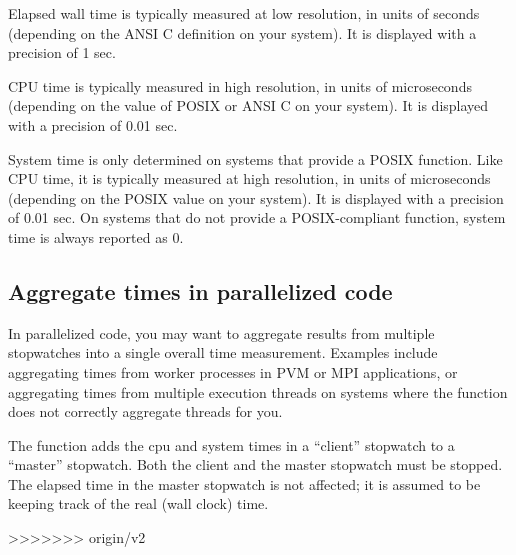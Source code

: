 Elapsed wall time is typically measured at low resolution, in units of
seconds (depending on the ANSI C  definition on your
system). It is displayed with a precision of 1 sec.

CPU time is typically measured in high resolution, in units of
microseconds (depending on the value of POSIX  or
ANSI C  on your system). It is displayed with a
precision of 0.01 sec.

System time is only determined on systems that provide a POSIX
 function. Like CPU time, it is typically measured at
high resolution, in units of microseconds (depending on the POSIX
 value on your system). It is displayed with a
precision of 0.01 sec.  On systems that do not provide a
POSIX-compliant  function, system time is always
reported as 0.

\subsection{Aggregate times in parallelized code}

In parallelized code, you may want to aggregate results from multiple
stopwatches into a single overall time measurement. Examples include
aggregating times from worker processes in PVM or MPI applications, or
aggregating times from multiple execution threads on systems where the
 function does not correctly aggregate threads for you.

The  function adds the cpu and system
times in a ``client'' stopwatch to a ``master'' stopwatch. Both the
client and the master stopwatch must be stopped. The elapsed time in
the master stopwatch is not affected; it is assumed to be keeping
track of the real (wall clock) time. 




>>>>>>> origin/v2
